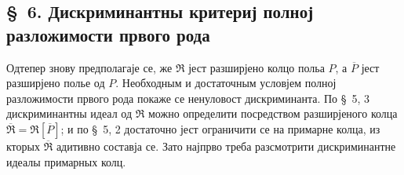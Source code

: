 \documentclass[11pt]{article}
\begin{document}
\setcounter{footnote}{26}

\subsection*{\S~6. Дискриминантны критериј полној разложимости првого рода}

Одтепер знову предполагаје се, же $\mathfrak R$ јест разширјено колцо польа $P$, а $\overline P$ јест разширјено полье од $P$. Необходным и достаточным условјем полној разложимости првого рода покаже се ненуловост дискриминанта. По \S~5, 3 дискриминантны идеал од $\mathfrak R$ можно определити посредством разширјеного колца $\overline{\mathfrak R}=\mathfrak R[\overline P]$; и по \S~5, 2 достаточно јест ограничити се на примарне колца, из кторых $\overline{\mathfrak R}$ адитивно составја се. Зато најпрво треба разсмотрити дискриминантне идеалы примарных колц.
\end{document}
